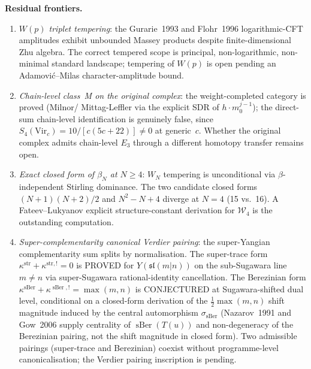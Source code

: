 \documentclass[11pt,reqno]{amsart}
\theoremstyle{definition}
\theoremstyle{remark}
\providecommand{\cW}{\mathcal{W}}
\providecommand{\Vir}{\mathrm{Vir}}
\providecommand{\str}{\mathrm{str}}
\providecommand{\sBer}{\operatorname{sBer}}
\numberwithin{equation}{section}
\begin{document}
\smallskip\noindent\textbf{Residual frontiers.}
\begin{enumerate}[nosep]
\item \emph{$W(p)$ triplet tempering}: the Gurarie~1993 and
 Flohr~1996 logarithmic-CFT amplitudes exhibit unbounded
 Massey products despite finite-dimensional Zhu algebra. The
 correct tempered scope is principal, non-logarithmic,
 non-minimal standard landscape; tempering of $W(p)$ is
 open pending an Adamovi\'c--Milas character-amplitude
 bound.
\item \emph{Chain-level class~M on the original complex}:
 the weight-completed category is proved (Milnor/
 Mittag-Leffler via the explicit SDR of $h\cdot m_0^{j-1}$);
 the direct-sum chain-level identification is genuinely
 false, since $S_4(\Vir_c) = 10/[c(5c + 22)] \neq 0$ at
 generic~$c$. Whether the original complex admits chain-level
 $E_3$ through a different homotopy transfer remains open.
\item \emph{Exact closed form of $\beta_N$ at $N \geq 4$}:
 $W_N$ tempering is unconditional via $\beta$-independent
 Stirling dominance. The two candidate closed forms
 $(N{+}1)(N{+}2)/2$ and $N^2 - N + 4$ diverge at $N = 4$ (15
 vs.~16). A Fateev--Lukyanov explicit structure-constant
 derivation for $\cW_4$ is the outstanding computation.
\item \emph{Super-complementarity canonical Verdier pairing}:
 the super-Yangian complementarity sum splits by normalisation.
 The super-trace form
 $\kappa^{\str} + \kappa^{\str,!} = 0$ is PROVED for
 $Y(\mathfrak{sl}(m|n))$ on the sub-Sugawara line $m\neq n$ via
 super-Sugawara rational-identity cancellation. The Berezinian
 form $\kappa^{\sBer} + \kappa^{\sBer,!} = \max(m,n)$ is
 CONJECTURED at Sugawara-shifted dual level, conditional on a
 closed-form derivation of the $\tfrac{1}{2}\max(m,n)$ shift
 magnitude induced by the central automorphism $\sigma_{\sBer}$
 (Nazarov~1991 and Gow~2006 supply centrality of $\sBer(T(u))$
 and non-degeneracy of the Berezinian pairing, not the
 shift magnitude in closed form). Two admissible pairings
 (super-trace and Berezinian) coexist without
 programme-level canonicalisation; the Verdier pairing
 inscription is pending.
\end{enumerate}
\end{document}
